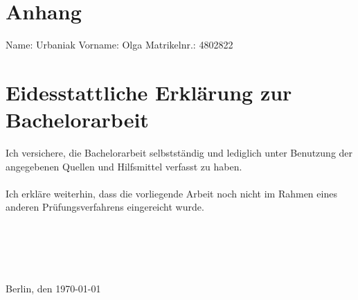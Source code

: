 \section{Anhang}
\vspace{6cm}
Name: Urbaniak \hfill Vorname: Olga \hfill Matrikelnr.: 4802822
\section*{Eidesstattliche Erklärung zur Bachelorarbeit}
\vspace{2cm}
Ich versichere, die Bachelorarbeit selbstständig und lediglich unter Benutzung der angegebenen Quellen und Hilfsmittel verfasst zu haben.
\\\\
Ich erkläre weiterhin, dass die vorliegende Arbeit noch nicht im Rahmen eines anderen Prüfungsverfahrens eingereicht wurde.
\\\\
\\\\
\\\\
Berlin, den \today
\clearpage
\pagestyle{fancy}
\fancyhf{} %
